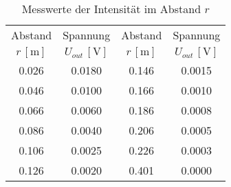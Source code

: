 \begin{table}[!h]
	\centering
	\begin{tabular}{|c|c||c|c|}
		\hline
		Abstand & Spannung & Abstand & Spannung\\
		$r\,[\si{\meter}]$ & $U_{out}\,[\si{\volt}]$ & $r\,[\si{\meter}]$ & $U_{out}\,[\si{\volt}]$\\\hline\hline
		\num{0.026}  & \num{0.0180} & \num{0.146}  & \num{0.0015} \\
		\num{0.046}  & \num{0.0100} & \num{0.166}  & \num{0.0010} \\
		\num{0.066}  & \num{0.0060} & \num{0.186}  & \num{0.0008} \\
		\num{0.086}  & \num{0.0040} & \num{0.206}  & \num{0.0005} \\
		\num{0.106}  & \num{0.0025} & \num{0.226}  & \num{0.0003} \\
		\num{0.126}  & \num{0.0020} & \num{0.401}  & \num{0.0000} \\
		\hline
	\end{tabular}
	\caption{Messwerte der Intensität im Abstand $r$ \label{tab:Abstand}}
\end{table}